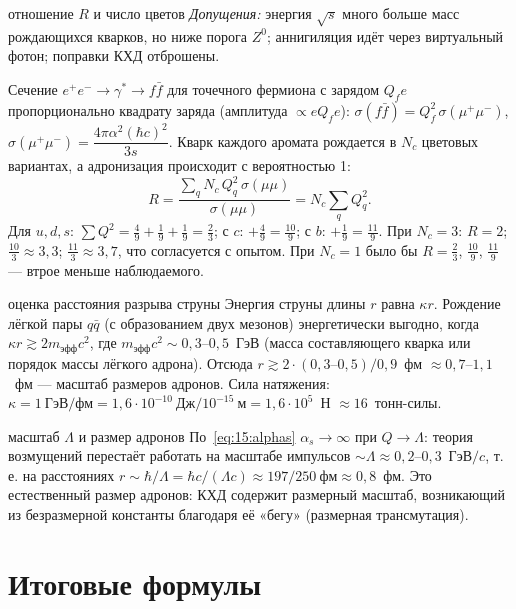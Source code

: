 \begin{derivation}[label=der:15:R]{отношение $R$ и число цветов}
\emph{Допущения:} энергия $\sqrt s$ много больше масс рождающихся кварков, но ниже порога $Z^0$; аннигиляция идёт через
виртуальный фотон; поправки КХД отброшены.

Сечение $e^+e^-\to\gamma^*\to f\bar f$ для точечного фермиона с зарядом $Q_fe$ пропорционально квадрату заряда
(амплитуда $\propto eQ_fe$): $\sigma(f\bar f)=Q_f^2\,\sigma(\mu^+\mu^-)$, $\sigma(\mu^+\mu^-)=\dfrac{4\pi\alpha^2(\hbar c)^2}{3s}$.
Кварк каждого аромата рождается в $N_c$ цветовых вариантах, а адронизация происходит с вероятностью 1:
\[
  R=\frac{\sum_q N_c\,Q_q^2\,\sigma(\mu\mu)}{\sigma(\mu\mu)}=N_c\sum_qQ_q^2 .
\]
Для $u,d,s$: $\sum Q^2=\frac49+\frac19+\frac19=\frac23$; с $c$: $+\frac49=\frac{10}9$; с $b$: $+\frac19=\frac{11}9$. При $N_c=3$:
$R=2$; $\frac{10}{3}\approx3{,}3$; $\frac{11}{3}\approx3{,}7$, что согласуется с опытом. При $N_c=1$ было бы $R=\frac23$, $\frac{10}9$, $\frac{11}9$ —
втрое меньше наблюдаемого.
\end{derivation}

\begin{derivation}[label=der:15:string]{оценка расстояния разрыва струны}
Энергия струны длины $r$ равна $\kappa r$. Рождение лёгкой пары $q\bar q$ (с образованием двух мезонов) энергетически
выгодно, когда $\kappa r\gtrsim2m_{\text{эфф}}c^2$, где $m_{\text{эфф}}c^2\sim0{,}3$--$0{,}5$~ГэВ (масса составляющего кварка или
порядок массы лёгкого адрона). Отсюда $r\gtrsim2\cdot(0{,}3\text{--}0{,}5)/0{,}9$~фм $\approx0{,}7$--$1{,}1$~фм — масштаб размеров адронов.
Сила натяжения: $\kappa=1\ \text{ГэВ/фм}=1{,}6\cdot10^{-10}\ \text{Дж}/10^{-15}\ \text{м}=1{,}6\cdot10^{5}$~Н $\approx16$~тонн-силы.
\end{derivation}

\begin{derivation}[label=der:15:af]{масштаб $\Lambda$ и размер адронов}
По~\eqref{eq:15:alphas} $\alpha_s\to\infty$ при $Q\to\Lambda$: теория возмущений перестаёт работать на масштабе импульсов
$\sim\Lambda\approx0{,}2$--$0{,}3$~ГэВ$/c$, т.\,е. на расстояниях $r\sim\hbar/\Lambda=\hbar c/(\Lambda c)\approx197/250\ \text{фм}\approx0{,}8$~фм. Это
естественный размер адронов: КХД содержит размерный масштаб, возникающий из безразмерной константы
благодаря её «бегу» (размерная трансмутация).
\end{derivation}

\section{Итоговые формулы}

